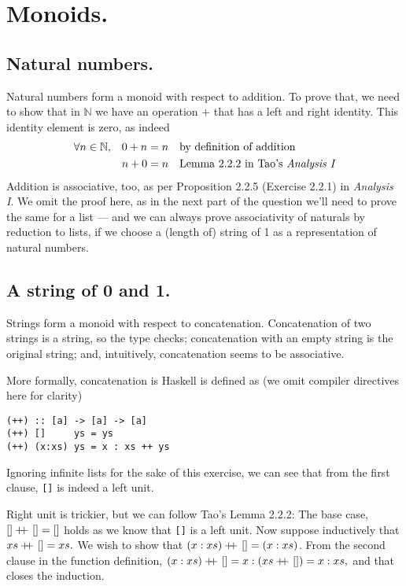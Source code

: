 \section{ Monoids. }

\subsection{Natural numbers.} Natural numbers form a monoid with respect to addition.
To prove that, we need to show that in $\mathbb{N}$ we have an operation $+$ that has a left and right identity.
This identity element is zero, as indeed
\begin{align*}
\forall n \in \mathbb{N},&& 0 + n &= n && \text{by definition of addition} \\
                         && n + 0 &= n && \text{Lemma 2.2.2 in Tao's {\em Analysis I}}
\end{align*}
Addition is associative, too, as per Proposition 2.2.5 (Exercise 2.2.1) in {\em Analysis I}\cite{tao2016analysis}.
We omit the proof here, as in the next part of the question we'll need to prove the same for a list --- and we can always 
prove associativity of naturals by reduction to lists, if we choose a (length of) string of 1 as a representation of natural numbers.

\subsection{A string of 0 and 1.}
Strings form a monoid with respect to concatenation. Concatenation of two strings is a string, so the type checks;
concatenation with an empty string is the original string; and, intuitively, concatenation seems to be associative. 

\newcommand\cat{+\kern-1.3ex+\kern0.8ex} %
More formally, concatenation is Haskell is defined as (we omit compiler directives here for clarity)
\begin{verbatim}
(++) :: [a] -> [a] -> [a]
(++) []     ys = ys
(++) (x:xs) ys = x : xs ++ ys
\end{verbatim}
Ignoring infinite lists for the sake of this exercise, we can see that from the first clause, \texttt{[]} is indeed a left unit. 

Right unit is trickier, but we can follow Tao's Lemma 2.2.2: The base case, $[] \cat [] = []$ holds as we know that \texttt{[]} 
is a left unit. Now suppose inductively that $xs \cat [] = xs.$ We wish to show that $(x:xs) \cat [] = (x:xs)$. 
From the second clause in the function definition, $(x:xs) \cat [] = x : (xs \cat []) = x : xs,$ and that closes the induction.

